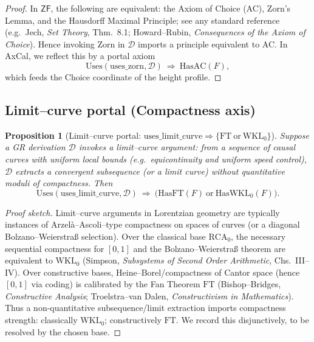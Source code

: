 \documentclass[11pt]{article}
\newtheorem{proposition}[theorem]{Proposition}
\theoremstyle{definition}
\theoremstyle{remark}
\newcommand{\ZF}{\mathsf{ZF}}
\newcommand{\FT}{\mathrm{FT}}
\newcommand{\WKLz}{\mathrm{WKL}_0}
\newcommand{\RCA}{\mathrm{RCA}}
\begin{document}
\begin{proof}
In $\ZF$, the following are equivalent: the Axiom of Choice (AC), Zorn's Lemma, and the Hausdorff Maximal Principle; see any standard reference (e.g.\ Jech, \emph{Set Theory}, Thm.~8.1; Howard–Rubin, \emph{Consequences of the Axiom of Choice}). Hence invoking Zorn in $\mathcal{D}$ imports a principle equivalent to AC. In AxCal, we reflect this by a portal axiom
\[
\mathrm{Uses}(\mathrm{uses\_zorn},\mathcal{D})\ \Rightarrow\ \mathrm{HasAC}(F),
\]
which feeds the Choice coordinate of the height profile. \qedhere
\end{proof}

\subsection{Limit–curve portal (Compactness axis)}

\begin{proposition}[Limit–curve portal: $\mathrm{uses\_limit\_curve}\Rightarrow\{\FT\ \text{or}\ \WKLz\}$]
\label{prop:limit-curve-portal}
Suppose a GR derivation $\mathcal{D}$ invokes a \emph{limit–curve} argument: from a sequence of causal curves with uniform local bounds (e.g.\ equicontinuity and uniform speed control), $\mathcal{D}$ extracts a convergent subsequence (or a limit curve) without quantitative moduli of compactness. Then
\[
\mathrm{Uses}(\mathrm{uses\_limit\_curve},\mathcal{D}) \ \Rightarrow\ \big(\mathrm{HasFT}(F)\ \text{or}\ \mathrm{HasWKL}_0(F)\big).
\]
\end{proposition}

\begin{proof}[Proof sketch]
Limit–curve arguments in Lorentzian geometry are typically instances of Arzelà–Ascoli–type compactness on spaces of curves (or a diagonal Bolzano–Weierstraß selection). Over the classical base $\RCA_0$, the necessary sequential compactness for $[0,1]$ and the Bolzano–Weierstraß theorem are equivalent to $\WKLz$ (Simpson, \emph{Subsystems of Second Order Arithmetic}, Chs.~III–IV). Over constructive bases, Heine–Borel/compactness of Cantor space (hence $[0,1]$ via coding) is calibrated by the Fan Theorem $\FT$ (Bishop–Bridges, \emph{Constructive Analysis}; Troelstra–van Dalen, \emph{Constructivism in Mathematics}). Thus a non-quantitative subsequence/limit extraction imports compactness strength: classically $\WKLz$; constructively $\FT$. We record this disjunctively, to be resolved by the chosen base. \qedhere
\end{proof}
\end{document}
